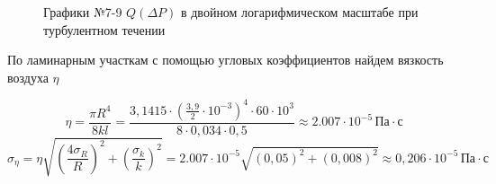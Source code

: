 \documentclass[a4paper]{article}
\begin{document}
\begin{enumerate}
\begin{figure}[h!]
\caption[]{\label{} Графики №7-9 $Q(\Delta P)$ в двойном логарифмическом масштабе при турбулентном течении}
\end{figure}
По ламинарным участкам с помощью угловых коэффициентов найдем вязкость воздуха $\eta$

\begin{equation*}
	\eta = \frac{\pi R^4}{8kl} = \frac{3,1415 \cdot (\frac{3,9}{2} \cdot 10^{-3})^4 \cdot 60 \cdot 10^3}{8\cdot 0,034 \cdot 0,5} \approx 2.007 \cdot 10^{-5} \, \text{Па} \cdot \text{с}
\end{equation*}
\begin{equation*}
	\sigma_\eta = \eta \sqrt{\left(\frac{4\sigma_R}{R}\right)^2 + \left(\frac{\sigma_k}{k}\right)^2} = 2.007 \cdot 10^{-5} \sqrt{(0,05)^2 + (0,008)^2} \approx 0,206 \cdot 10^{-5} \, \text{Па} \cdot \text{с}
\end{equation*}


\end{enumerate}
\end{document}

